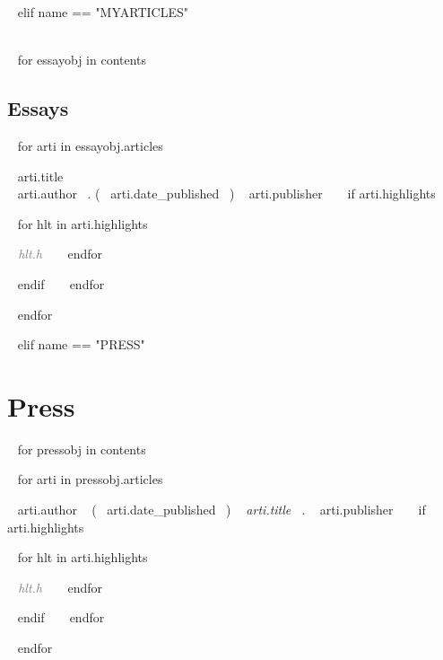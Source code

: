 ~{ elif name == "MYARTICLES" }~

\needspace{\headerpush}
\myRule{\columnwidth}{1pt}\\

~{ for essayobj in contents }~ 
\subsection{Essays} 
\begin{etaremune}[itemindent=-1.5\bibhang, topsep=0pt,
				   itemsep=\bibsep,partopsep=0pt,parsep=0pt,leftmargin={\bibhang+\widthof{[999]}}] 
    ~{ for arti in essayobj.articles  }~
    \item ~{{ arti.title }}~ \\
     ~{{ arti.author }}~. (~{{ arti.date_published }}~) ~{{ arti.publisher }}~
     ~{ if arti.highlights }~
     	\begin{innerlist}
     	~{ for hlt in arti.highlights }~
	     \item  \textcolor{grey}{\textit{~{{ hlt.h }}~} }
     	~{ endfor }~
     	\end{innerlist}
     ~{ endif }~
	~{ endfor }~

\end{etaremune}

~{ endfor }~



~{ elif name == "PRESS" }~

\section{Press}

~{ for pressobj in contents }~ 
\begin{etaremune}[itemindent=-1.5\bibhang, topsep=0pt,
				   itemsep=\bibsep,partopsep=0pt,parsep=0pt,leftmargin={\bibhang+\widthof{[999]}}] 
    
    ~{ for arti in pressobj.articles }~
    \item ~{{ arti.author }}~ (~{{ arti.date_published }}~) \textit{~{{ arti.title }}~}. ~{{ arti.publisher }}~
     ~{ if arti.highlights }~
     	\begin{innerlist}
     	~{ for hlt in arti.highlights }~
	     \item  \textcolor{grey}{\textit{~{{ hlt.h }}~} }
     	~{ endfor }~
     	\end{innerlist}
     ~{ endif }~
	~{ endfor }~


\end{etaremune}
~{ endfor }~


